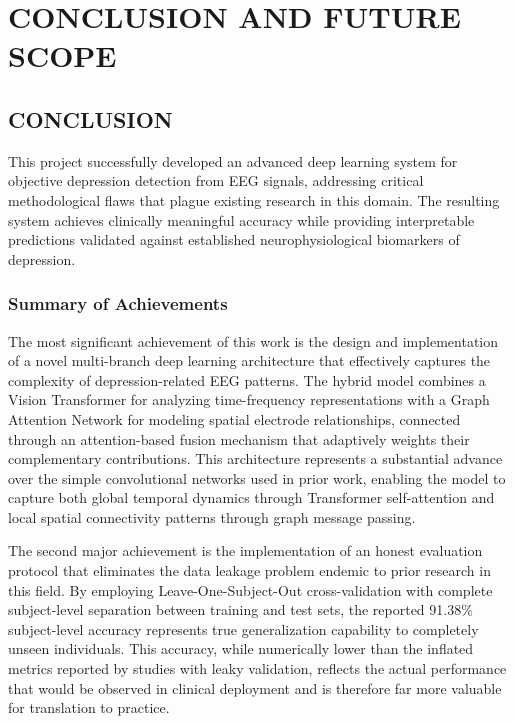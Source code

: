 
\chapter{CONCLUSION AND FUTURE SCOPE}

\section{CONCLUSION}

This project successfully developed an advanced deep learning system for objective depression detection from EEG signals, addressing critical methodological flaws that plague existing research in this domain. The resulting system achieves clinically meaningful accuracy while providing interpretable predictions validated against established neurophysiological biomarkers of depression.

\subsection{Summary of Achievements}

The most significant achievement of this work is the design and implementation of a novel multi-branch deep learning architecture that effectively captures the complexity of depression-related EEG patterns. The hybrid model combines a Vision Transformer for analyzing time-frequency representations with a Graph Attention Network for modeling spatial electrode relationships, connected through an attention-based fusion mechanism that adaptively weights their complementary contributions. This architecture represents a substantial advance over the simple convolutional networks used in prior work, enabling the model to capture both global temporal dynamics through Transformer self-attention and local spatial connectivity patterns through graph message passing.

The second major achievement is the implementation of an honest evaluation protocol that eliminates the data leakage problem endemic to prior research in this field. By employing Leave-One-Subject-Out cross-validation with complete subject-level separation between training and test sets, the reported 91.38\% subject-level accuracy represents true generalization capability to completely unseen individuals. This accuracy, while numerically lower than the inflated metrics reported by studies with leaky validation, reflects the actual performance that would be observed in clinical deployment and is therefore far more valuable for translation to practice.

